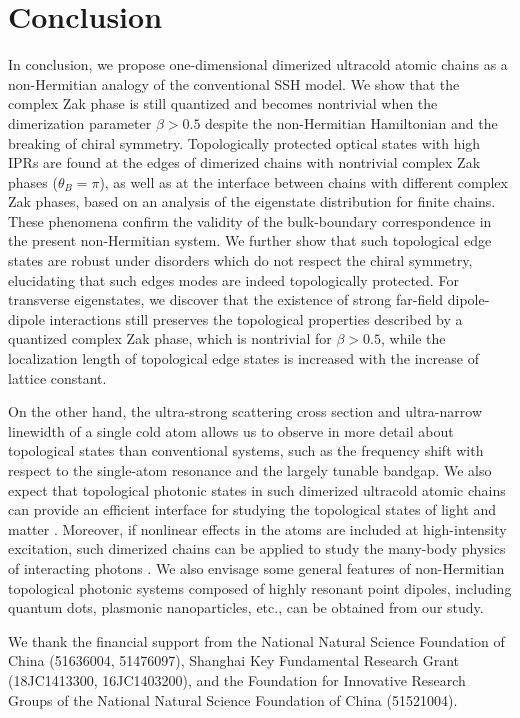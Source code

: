 \documentclass[aps,pra,reprint,groupedaddress,nofootinbib,longbibliography,showpacs]{revtex4-1}
\begin{document}
\section{Conclusion}
In conclusion, we propose one-dimensional dimerized ultracold atomic chains as a non-Hermitian analogy of the conventional SSH model. We show that the complex Zak phase is still quantized and becomes nontrivial when the dimerization parameter $\beta>0.5$ despite the non-Hermitian Hamiltonian and the breaking of chiral symmetry. Topologically protected optical states with high IPRs are found at the edges of dimerized chains with nontrivial complex Zak phases ($\theta_B=\pi$), as well as at the interface between chains with different complex Zak phases, based on an analysis of the eigenstate distribution for finite chains. These phenomena confirm the validity of the bulk-boundary correspondence in the present non-Hermitian system. We further show that such topological edge states are robust under disorders which do not respect the chiral symmetry, elucidating that such edges modes are indeed topologically protected. For transverse eigenstates, we discover that the existence of strong far-field dipole-dipole interactions still preserves the topological properties described by a quantized complex Zak phase, which is nontrivial for $\beta>0.5$, while the localization length of topological edge states is increased with the increase of lattice constant.
	
On the other hand, the ultra-strong scattering cross section and ultra-narrow linewidth of a single cold atom allows us to observe in more detail about topological states than conventional systems, such as the frequency shift with respect to the single-atom resonance and the largely tunable bandgap. We also expect that topological photonic states in such dimerized ultracold atomic chains can provide an efficient interface for studying the topological states of light and matter \cite{zollerNaturephys2016}. Moreover, if nonlinear effects in the atoms are included at high-intensity excitation, such dimerized chains can be applied to study the many-body physics of interacting photons \cite{yelinPRL2017,yelinPRL20172}. We also envisage some general features of non-Hermitian topological photonic systems composed of highly resonant point dipoles, including quantum dots, plasmonic nanoparticles, etc., can be obtained from our study. 

\begin{acknowledgments}
We thank the financial support from the National Natural Science Foundation of China (51636004, 51476097), Shanghai Key Fundamental Research Grant (18JC1413300, 16JC1403200), and the Foundation for Innovative Research Groups of the National Natural Science Foundation of China (51521004).
\end{acknowledgments}


\end{document}
